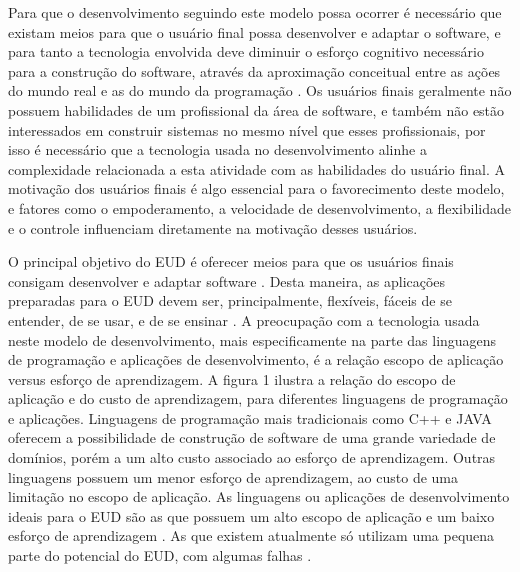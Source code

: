 Para que o desenvolvimento seguindo este modelo possa ocorrer é necessário que existam meios para que o usuário final possa desenvolver e adaptar o software, e para tanto a tecnologia envolvida deve diminuir o esforço cognitivo necessário para a construção do software, através da aproximação conceitual entre as ações do mundo real e as do mundo da programação \cite{fischer2004}. Os usuários finais geralmente não possuem habilidades de um profissional da área de software, e também não estão interessados em construir sistemas no mesmo nível que esses profissionais, por isso é necessário que a tecnologia usada no desenvolvimento alinhe a complexidade relacionada a esta atividade com as habilidades do usuário final. A motivação dos usuários finais é algo essencial para o favorecimento deste modelo, e fatores como o empoderamento, a velocidade de desenvolvimento, a flexibilidade e o controle influenciam diretamente na motivação desses usuários.

O principal objetivo do EUD é oferecer meios para que os usuários finais consigam desenvolver e adaptar software \cite{lieberman2006}. Desta maneira, as aplicações preparadas para o EUD devem ser, principalmente, flexíveis, fáceis de se entender, de se usar, e de se ensinar \cite{lieberman2006}. A preocupação com a tecnologia usada neste modelo de desenvolvimento, mais especificamente na parte das linguagens de programação e aplicações de desenvolvimento, é a relação escopo de aplicação versus esforço de aprendizagem. A figura 1 ilustra a relação do escopo de aplicação e do custo de aprendizagem, para diferentes linguagens de programação e aplicações. Linguagens de programação mais tradicionais como C++ e JAVA oferecem a possibilidade de construção de software de uma grande variedade de domínios, porém a um alto custo associado ao esforço de aprendizagem. Outras linguagens possuem um menor esforço de aprendizagem, ao custo de uma limitação no escopo de aplicação. As linguagens ou aplicações de desenvolvimento ideais para o EUD são as que possuem um alto escopo de aplicação e um baixo esforço de aprendizagem \cite{fischer2004}. As que existem atualmente só utilizam uma pequena parte do potencial do EUD, com algumas falhas \cite{paterno2013}.


